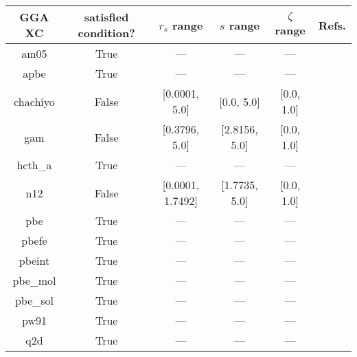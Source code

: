 \begin{tabular}{|c|c|c|c|c|l|}
\hline
  GGA XC &  satisfied condition? &      $r_s$ range &     $s$ range & $\zeta$ range  &                                                 Refs. \\ \hline
    am05 &                  True &              --- &           --- &            --- &        \cite{Armiento2005_085108,Mattsson2008_084714} \\ \hline
    apbe &                  True &              --- &           --- &            --- &                          \cite{Constantin2011_186406} \\ \hline
chachiyo &                 False &    [0.0001, 5.0] &    [0.0, 5.0] &     [0.0, 1.0] &                            \cite{Chachiyo2020_112669} \\ \hline
     gam &                 False &    [0.3796, 5.0] & [2.8156, 5.0] &     [0.0, 1.0] &                                   \cite{Yu2015_12146} \\ \hline
 hcth\_a &                  True &              --- &           --- &            --- &                             \cite{Hamprecht1998_6264} \\ \hline
     n12 &                 False & [0.0001, 1.7492] & [1.7735, 5.0] &     [0.0, 1.0] &                              \cite{Peverati2012_2310} \\ \hline
     pbe &                  True &              --- &           --- &            --- &            \cite{Perdew1996_3865,Perdew1996_3865_err} \\ \hline
   pbefe &                  True &              --- &           --- &            --- &                                 \cite{Perez2015_3844} \\ \hline
  pbeint &                  True &              --- &           --- &            --- &                             \cite{Fabiano2010_113104} \\ \hline
pbe\_mol &                  True &              --- &           --- &            --- &                            \cite{delCampo2012_104108} \\ \hline
pbe\_sol &                  True &              --- &           --- &            --- &                              \cite{Perdew2008_136406} \\ \hline
    pw91 &                  True &              --- &           --- &            --- & \cite{Perdew1991,Perdew1992_6671,Perdew1992_6671_err} \\ \hline
     q2d &                  True &              --- &           --- &            --- &                              \cite{Chiodo2012_126402} \\ \hline

\end{tabular}
